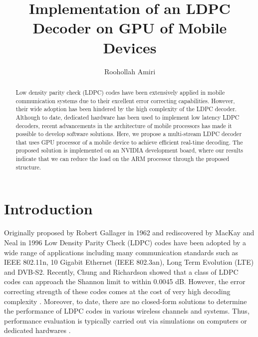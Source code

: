\documentclass[10pt,a4paper]{article}
\begin{document}
\title{Implementation of an LDPC Decoder on GPU of Mobile Devices}
\author{Roohollah Amiri}
\maketitle

\begin{abstract}

Low density parity check (LDPC) codes have been extensively applied in mobile communication systems due to their excellent error correcting capabilities. However, their wide adoption has been hindered by the high complexity of the LDPC decoder. Although to date, dedicated hardware has been used to implement low latency LDPC decoders, recent advancements in the architecture of mobile processors has made it possible to develop software solutions. Here, we propose a multi-stream LDPC decoder that uses GPU processor of a mobile device to achieve efficient real-time decoding. The proposed solution is implemented on an NVIDIA development board, where our results indicate that we can reduce the load on the ARM processor through the proposed structure.

\end{abstract}


\section{Introduction}
Originally proposed by Robert Gallager in 1962 \cite{art_gallager} and rediscovered by MacKay and Neal in 1996 \cite{art_macKay} Low Density Parity Check (LDPC) codes have been adopted by a wide range of applications including many communication standards such as IEEE 802.11n, 10 Gigabit Ethernet (IEEE 802.3an), Long Term Evolution (LTE) and DVB-S2. Recently, Chung and Richardson \cite{art_shannon} showed that a class of LDPC codes can approach the Shannon limit to within 0.0045 dB. However, the error correcting strength of these codes comes at the cost of very high decoding complexity \cite{art_ldpc_cpu1}. Moreover, to date, there are no closed-form solutions to determine the performance of LDPC codes in various wireless channels and systems. Thus, performance evaluation is typically carried out via simulations on computers or dedicated hardwares \cite{art_memory_coalesced}.
\end{document}
